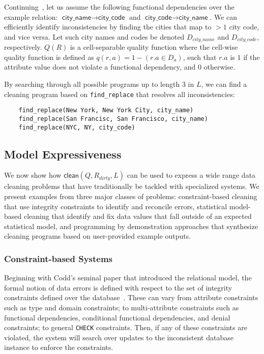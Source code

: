 \begin{example}\label{ex3}
Continuing~, let us assume the following functional dependencies over the example relation: $\textsf{city\_name} \rightarrow \textsf{city\_code}$ and $\textsf{city\_code} \rightarrow \textsf{city\_name}$.
We can efficiently identify inconsistencies by finding the cities that map to $>1$ city code, and vice versa.   Let such city names and codes be denoted $D_{city\_name}$ and $D_{city\_code}$, respectively.
$Q(R)$ is a cell-separable quality function where the cell-wise quality function is defined as $q(r, a) = 1 - (r.a \in D_a)$, such that $r.a$ is $1$ if the attribute value does not violate a functional dependency, and $0$ otherwise.

By searching through all possible programs up to length 3 in $L$, we can find a cleaning program based on \texttt{find\_replace} that resolves all inconsistencies:
\begin{lstlisting}
    find_replace(New York, New York City, city_name)
    find_replace(San Francisc, San Francisco, city_name)
    find_replace(NYC, NY, city_code)
\end{lstlisting}
\end{example}


\subsection{Model Expressiveness}
We now show how $\textsf{clean}(Q,R_{dirty},L)$ can be used to express a wide range data cleaning problems that have traditionally be tackled with specialized systems.  We present examples from three major classes of problems: constraint-based cleaning that use integrity constraints to identify and reconcile errors, statistical model-based  cleaning that identify and fix data values that fall outside of an expected statistical model, and programming by demonstration approaches that synthesize cleaning programs based on user-provided example outputs.  

\subsubsection{Constraint-based Systems}
Beginning with Codd's seminal paper that introduced the relational model, the formal notion of data errors is defined with respect to the set of integrity constraints defined over the database~\cite{codd1970relational}.   These can vary from attribute constraints such as type and domain constraints; to multi-attribute constraints such as functional dependencies, conditional functional dependencies, and denial constraints; to general \texttt{CHECK} constraints.   
Then, if any of these constraints are violated, the system will search over updates to the inconsistent database instance to enforce the constraints.

